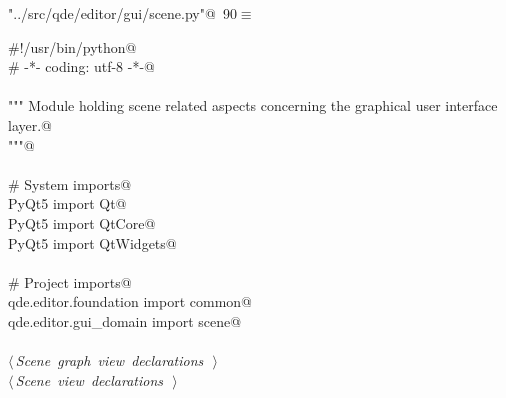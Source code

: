 \documentclass[
    a4paper,      %
    10pt,         %
    openright,    %
    notitlepage,  %
    parskip=half, %
]{scrreprt}       %
\theoremstyle{definition}                    %
\begin{document}
\begin{flushleft} \small
\begin{minipage}{\linewidth}\label{scrap144}\raggedright\small
{} \verb@"../src/qde/editor/gui/scene.py"@\nobreak\ {\footnotesize {90}}$\equiv$
\vspace{-1ex}
\begin{list}{}{} \item
\mbox{}\lstinline@#!/usr/bin/python@\\
\mbox{}\lstinline@# -*- coding: utf-8 -*-@\\
\mbox{}\lstinline@@\\
\mbox{}\lstinline@""" Module holding scene related aspects concerning the graphical user interface layer.@\\
\mbox{}\lstinline@"""@\\
\mbox{}\lstinline@@\\
\mbox{}\lstinline@# System imports@\\
\mbox{}\lstinline@from PyQt5 import Qt@\\
\mbox{}\lstinline@from PyQt5 import QtCore@\\
\mbox{}\lstinline@from PyQt5 import QtWidgets@\\
\mbox{}\lstinline@@\\
\mbox{}\lstinline@# Project imports@\\
\mbox{}\lstinline@from qde.editor.foundation import common@\\
\mbox{}\lstinline@from qde.editor.gui_domain import scene@\\
\mbox{}\lstinline@@\\
\mbox{}\lstinline@@\hbox{$\langle\,${\itshape Scene graph view declarations}\nobreak\ {\footnotesize {}}$\,\rangle$}\lstinline@@\\
\mbox{}\lstinline@@\hbox{$\langle\,${\itshape Scene view declarations}\nobreak\ {\footnotesize {}}$\,\rangle$}\lstinline@@\\
\mbox{}\lstinline@@{\NWsep}
\end{list}
\vspace{-1.5ex}
\footnotesize
\begin{list}{}{\setlength{\itemsep}{-\parsep}\setlength{\itemindent}{-\leftmargin}}

\item{}
\end{list}
\end{minipage}\vspace{4ex}
\end{flushleft}
\end{document}
